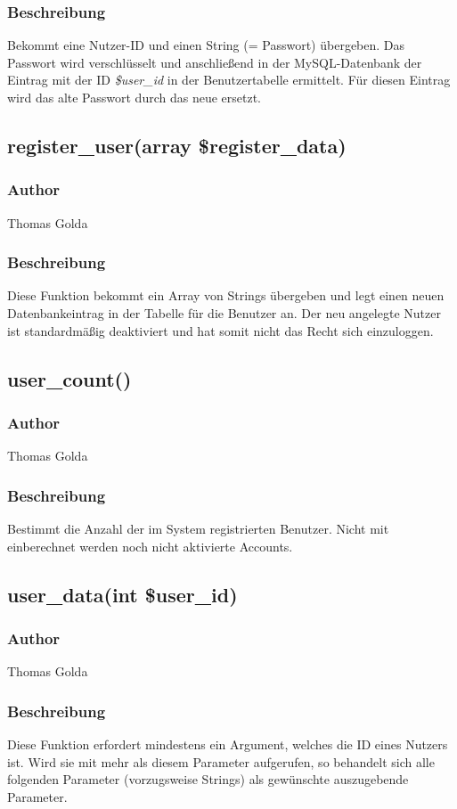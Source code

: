 \documentclass[fontsize = 12pt, paper = a4]{scrreprt}
\begin{document}
\subsubsection*{Beschreibung}
Bekommt eine Nutzer-ID und einen String (= Passwort) übergeben. Das Passwort wird verschlüsselt und anschließend in der MySQL-Datenbank der Eintrag mit der ID \textit{\$user\_id} in der Benutzertabelle ermittelt. Für diesen Eintrag wird das alte Passwort durch das neue ersetzt.


\subsection*{register\_user(array \$register\_data)}
\subsubsection*{Author}
Thomas Golda
\subsubsection*{Beschreibung}
Diese Funktion bekommt ein Array von Strings übergeben und legt einen neuen Datenbankeintrag in der Tabelle für die Benutzer an.
Der neu angelegte Nutzer ist standardmäßig deaktiviert und hat somit nicht das Recht sich einzuloggen.


\subsection*{user\_count()}
\subsubsection*{Author}
Thomas Golda
\subsubsection*{Beschreibung}
Bestimmt die Anzahl der im System registrierten Benutzer. Nicht mit einberechnet werden noch nicht aktivierte Accounts.

\newpage

\subsection*{user\_data(int \$user\_id)}
\subsubsection*{Author}
Thomas Golda
\subsubsection*{Beschreibung}
Diese Funktion erfordert mindestens ein Argument, welches die ID eines Nutzers ist. Wird sie mit mehr als diesem Parameter aufgerufen, so 
behandelt sich alle folgenden Parameter (vorzugsweise Strings) als gewünschte auszugebende Parameter.
\end{document}
